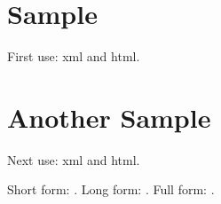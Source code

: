 \documentclass{report}
\begin{document}
\chapter{Sample}

First use: \gls{xml} and \gls{html}.

\chapter{Another Sample}

Next use: \gls{xml} and \gls{html}.

Short form: \@. Long form: .
Full form: .

\printglossaries
\end{document}
